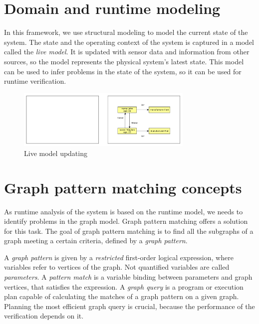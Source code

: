 \section{Domain and runtime modeling}

In this framework, we use structural modeling to model the current state of the system. 
The state and the operating context of the system is captured in a model called the \emph{live model}.
It is updated with sensor data and information from other sources, so the model represents the physical system's latest state. 
This model can be used to infer problems in the state of the system, so it can be used for runtime verification.



\begin{figure}[h]
	\begin{center}
		\includegraphics[width=0.75\textwidth]{figures/live-models.pdf}
		\caption{Live model updating}
		\label{fig:live-models}
	\end{center}
\end{figure}

\section{Graph pattern matching concepts}

As runtime analysis of the system is based on the runtime model, we needs to identify problems in the graph model. 
Graph pattern matching offers a solution for this task. 
The goal of graph pattern matching is to find all the subgraphs of a graph meeting a certain criteria, defined by a \emph{graph pattern}.

A \emph{graph pattern} is given by a \emph{restricted} first-order logical expression, where variables refer to vertices of the graph.
Not quantified variables are called \emph{parameters}.  
A \emph{pattern match} is a variable binding between parameters and graph vertices, that satisfies the expression.
A \emph{graph query} is a program or execution plan capable of calculating the matches of a graph pattern on a given graph. 
Planning the most efficient graph query is crucial, because the performance of the verification depends on it.


